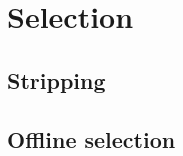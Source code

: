 \section{Selection}


\subsection{Stripping}

\subsection{Offline selection }

\begin{table}
\end{table}